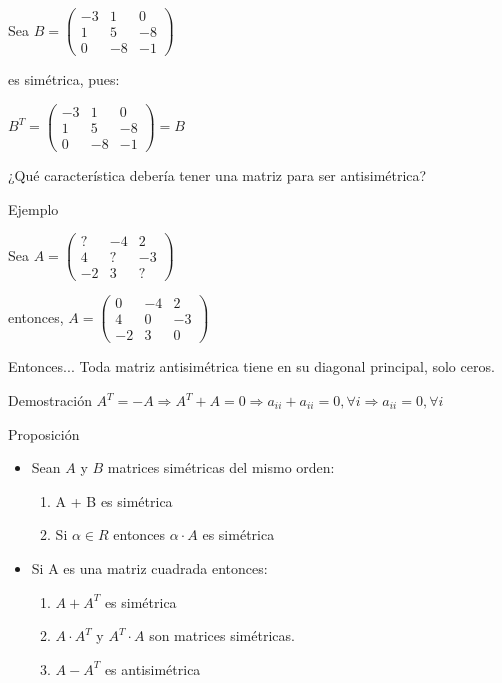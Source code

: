Sea $B=
\left(
\begin{array}{ccc}
-3 &  1  &  0 \\
 1 &  5  &  -8 \\
0  &  -8 &  -1
\end{array}
\right)
$

es simétrica, pues:

$B^T=
\left(
\begin{array}{ccc}
-3 &  1  &  0 \\
 1 &  5  &  -8 \\
0  &  -8 &  -1
\end{array}
\right)
= B$

¿Qué característica debería tener una matriz para ser 
antisimétrica?


{Ejemplo}

Sea $A=
\left(
\begin{array}{ccc}
?     &   -4   &  2  \\
4   & ?         &  -3  \\
-2  &  3    &    ? 
\end{array}
\right)
$

entonces, $A=
\left(
\begin{array}{ccc}
0  &   -4   &  2 \\
4   &  0    &  -3\\
-2  &  3    &    0
\end{array}
\right)
$

\begin{alertblock}{Entonces...}
Toda matriz antisimétrica tiene en su diagonal principal, solo ceros.
\end{alertblock}


{Demostración}
$A^T = -A \Rightarrow A^T + A = 0   \Rightarrow a_{ii} + a_{ii} = 0, \forall i \Rightarrow a_{ii} = 0, \forall i$ 


{Proposición}

\begin{itemize}
\item
Sean $A$ y $B$ matrices simétricas del mismo orden:

  \begin{enumerate}
      \item
         A + B es simétrica
      \item
        Si $\alpha \in R$ entonces  $\alpha \cdot A$ es simétrica
  \end{enumerate}

\item
 Si A es una matriz cuadrada entonces:

\begin{enumerate}
\item
$A +A^T$ es simétrica

\item
$A \cdot A^T$  y $A^T \cdot A$ son matrices simétricas.

\item
$A -A^T$ es antisimétrica
\end{enumerate}
\end{itemize}


